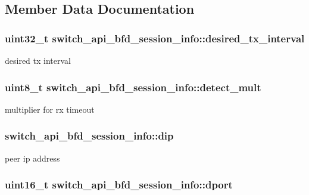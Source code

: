 \subsection{Member Data Documentation}
\hypertarget{structswitch__api__bfd__session__info_aaad45ed96cc3d7f364bb1571c85eb36d}{
\subsubsection[{desired\+\_\+tx\+\_\+interval}]{\setlength{\rightskip}{0pt plus 5cm}uint32\+\_\+t switch\+\_\+api\+\_\+bfd\+\_\+session\+\_\+info\+::desired\+\_\+tx\+\_\+interval}}\label{structswitch__api__bfd__session__info_aaad45ed96cc3d7f364bb1571c85eb36d}
desired tx interval \hypertarget{structswitch__api__bfd__session__info_a8abafe90c3a7b32677dac541c94631d2}{
\subsubsection[{detect\+\_\+mult}]{\setlength{\rightskip}{0pt plus 5cm}uint8\+\_\+t switch\+\_\+api\+\_\+bfd\+\_\+session\+\_\+info\+::detect\+\_\+mult}}\label{structswitch__api__bfd__session__info_a8abafe90c3a7b32677dac541c94631d2}
multiplier for rx timeout \hypertarget{structswitch__api__bfd__session__info_a61e43e2c51cb2c04fc7afc1a02f13c23}{
\subsubsection[{dip}]{ switch\+\_\+api\+\_\+bfd\+\_\+session\+\_\+info\+::dip}}\label{structswitch__api__bfd__session__info_a61e43e2c51cb2c04fc7afc1a02f13c23}
peer ip address \hypertarget{structswitch__api__bfd__session__info_a1d971da85ae5ef61d99b241474a338d4}{
\subsubsection[{dport}]{\setlength{\rightskip}{0pt plus 5cm}uint16\+\_\+t switch\+\_\+api\+\_\+bfd\+\_\+session\+\_\+info\+::dport}}\label{structswitch__api__bfd__session__info_a1d971da85ae5ef61d99b241474a338d4}
